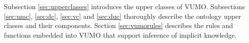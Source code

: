 \documentclass[]{interact}
\theoremstyle{plain}%
\theoremstyle{definition}
\theoremstyle{remark}
\theoremstyle{definition}
\begin{document}
Subsection \ref{sec:upperclasses} introduces the upper classes of VUMO. Subsections \ref{sec:umc}, \ref{sec:dc}, \ref{sec:vc} and \ref{sec:duc} thoroughly describe the ontology upper classes and their components. Section \ref{sec:vumorules} describes the rules and functions embedded into VUMO that support inference of implicit knowledge.



%
%
%
%
%
\end{document}
